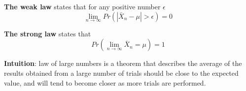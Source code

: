 \documentclass{article}
\newcommand*\mean[1]{\bar{#1}}
\begin{document}
\textbf{The weak law} states that for any positive number $\epsilon$
$$
\lim\limits_{n \to \infty}{Pr(|\mean{X}_n - \mu| > \epsilon)} = 0
$$

\textbf{The strong law} states that
$$
Pr(\lim\limits_{n \to \infty}{\mean{X}_n = \mu}) = 1
$$

\textbf{Intuition}: law of large numbers is a theorem that describes the average of the results obtained from a large number of trials should be close to the expected value, and will tend to become closer as more trials are performed.
\end{document}
